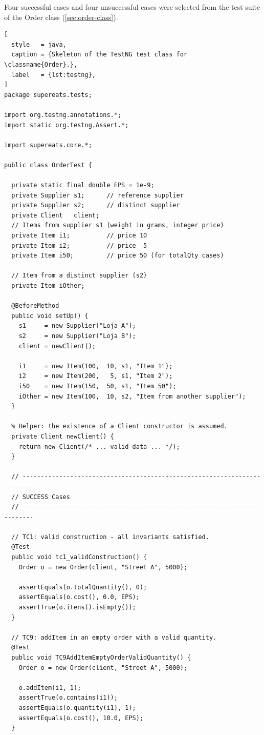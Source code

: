 \documentclass[11pt, a4paper]{article}
\newcommand{\classname}[1]{\textsf{#1}}
\begin{document}
Four successful cases and four unsuccessful cases were selected from the test suite of the \classname{Order} class (\cref{sec:order-class}).

\begin{lstlisting}[
  style   = java,
  caption = {Skeleton of the TestNG test class for \classname{Order}.},
  label   = {lst:testng},
]
package supereats.tests;

import org.testng.annotations.*;
import static org.testng.Assert.*;

import supereats.core.*;

public class OrderTest {

  private static final double EPS = 1e-9;
  private Supplier s1;      // reference supplier
  private Supplier s2;      // distinct supplier
  private Client   client;
  // Items from supplier s1 (weight in grams, integer price)
  private Item i1;          // price 10
  private Item i2;          // price  5
  private Item i50;         // price 50 (for totalQty cases)

  // Item from a distinct supplier (s2)
  private Item iOther;

  @BeforeMethod
  public void setUp() {
    s1     = new Supplier("Loja A");
    s2     = new Supplier("Loja B");
    client = newClient();

    i1     = new Item(100,  10, s1, "Item 1");
    i2     = new Item(200,   5, s1, "Item 2");
    i50    = new Item(150,  50, s1, "Item 50");
    iOther = new Item(100,  10, s2, "Item from another supplier");
  }

  % Helper: the existence of a Client constructor is assumed.
  private Client newClient() {
    return new Client(/* ... valid data ... */);
  }

  // -------------------------------------------------------------------------
  // SUCCESS Cases
  // -------------------------------------------------------------------------

  // TC1: valid construction - all invariants satisfied.
  @Test
  public void tc1_validConstruction() {
    Order o = new Order(client, "Street A", 5000);

    assertEquals(o.totalQuantity(), 0);
    assertEquals(o.cost(), 0.0, EPS);
    assertTrue(o.itens().isEmpty());
  }

  // TC9: addItem in an empty order with a valid quantity.
  @Test
  public void TC9AddItemEmptyOrderValidQuantity() {
    Order o = new Order(client, "Street A", 5000);

    o.addItem(i1, 1);
    assertTrue(o.contains(i1));
    assertEquals(o.quantity(i1), 1);
    assertEquals(o.cost(), 10.0, EPS);
  }


\end{lstlisting}
\end{document}
